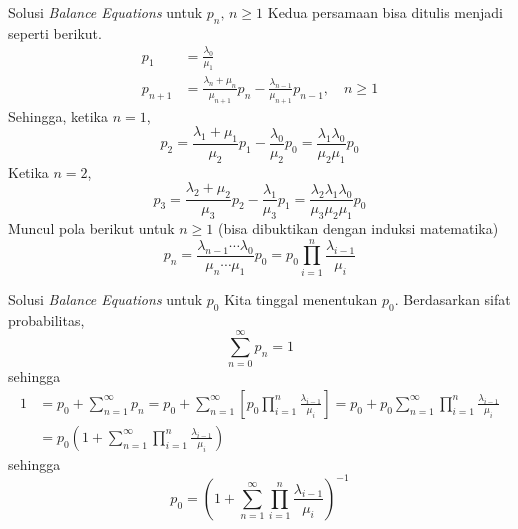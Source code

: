 \documentclass{beamer}
\newcommand{\pars}[1]{\left(#1\right)}
\newcommand{\brackets}[1]{\left[#1\right]}
\begin{document}
\begin{frame}{Solusi \textit{Balance Equations} untuk \(p_n, \, n \ge 1\)}
    Kedua persamaan bisa ditulis menjadi seperti berikut.
    \begin{align*}
        p_1 &= \frac{\lambda_0}{\mu_1} \\
        p_{n+1} &= \frac{\lambda_n + \mu_n}{\mu_{n+1}}p_n - \frac{\lambda_{n-1}}{\mu_{n+1}}p_{n-1}, \quad n \ge 1
    \end{align*}
    Sehingga, ketika \(n = 1\),
    \[p_2 = \frac{\lambda_1 + \mu_1}{\mu_2}p_1 - \frac{\lambda_0}{\mu_2}p_0 = \frac{\lambda_1 \lambda_0}{\mu_2 \mu_1} p_0\]
    Ketika \(n = 2\),
    \[p_3 = \frac{\lambda_2 + \mu_2}{\mu_3}p_2 - \frac{\lambda_1}{\mu_3}p_1 = \frac{\lambda_2 \lambda_1 \lambda_0}{\mu_3 \mu_2 \mu_1} p_0\]
    Muncul pola berikut untuk \(n \ge 1\) (bisa dibuktikan dengan induksi matematika)
    \[\boxed{
        p_n = \frac{\lambda_{n-1} \cdots \lambda_0}{\mu_n \cdots \mu_1} p_0 = p_0 \prod_{i=1}^{n} \frac{\lambda_{i-1}}{\mu_i}
    }\]
\end{frame}

\begin{frame}{Solusi \textit{Balance Equations} untuk \(p_0\)}
    Kita tinggal menentukan \(p_0\). Berdasarkan sifat probabilitas,
    \[\sum_{n=0}^{\infty} p_n = 1\]
    sehingga
    \begin{align*}
        1 &= p_0 + \sum_{n=1}^{\infty} p_n = p_0 + \sum_{n=1}^{\infty} \brackets{p_0 \prod_{i=1}^{n} \frac{\lambda_{i-1}}{\mu_i}} = p_0 + p_0 \sum_{n=1}^{\infty} \prod_{i=1}^{n} \frac{\lambda_{i-1}}{\mu_i} \\
        &= p_0 \pars{1 + \sum_{n=1}^{\infty} \prod_{i=1}^{n} \frac{\lambda_{i-1}}{\mu_i}}
    \end{align*}
    sehingga
    \[\boxed{
        p_0 = \pars{1 + \sum_{n=1}^{\infty} \prod_{i=1}^{n} \frac{\lambda_{i-1}}{\mu_i}}^{-1}
    }\]
\end{frame}
\end{document}
